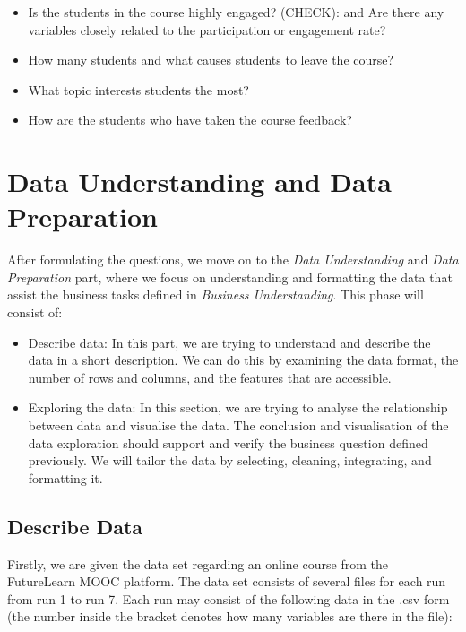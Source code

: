 \documentclass[12pt,]{article}
\providecommand{\tightlist}{%
\setlength{\itemsep}{0pt}\setlength{\parskip}{0pt}}
\begin{document}
\begin{itemize}
\tightlist
\item
  Is the students in the course highly engaged? (CHECK): and Are there
  any variables closely related to the participation or engagement rate?
\item
  How many students and what causes students to leave the course?
\item
  What topic interests students the most?
\item
  How are the students who have taken the course feedback?
\end{itemize}

\hypertarget{data-understanding-and-data-preparation}{%
\section{Data Understanding and Data
Preparation}\label{data-understanding-and-data-preparation}}

After formulating the questions, we move on to the \emph{Data
Understanding} and \emph{Data Preparation} part, where we focus on
understanding and formatting the data that assist the business tasks
defined in \emph{Business Understanding}. This phase will consist of:

\begin{itemize}
\item
  Describe data: In this part, we are trying to understand and describe
  the data in a short description. We can do this by examining the data
  format, the number of rows and columns, and the features that are
  accessible.
\item
  Exploring the data: In this section, we are trying to analyse the
  relationship between data and visualise the data. The conclusion and
  visualisation of the data exploration should support and verify the
  business question defined previously. We will tailor the data by
  selecting, cleaning, integrating, and formatting it.
\end{itemize}

\hypertarget{describe-data}{%
\subsection{Describe Data}\label{describe-data}}

Firstly, we are given the data set regarding an online course from the
FutureLearn MOOC platform. The data set consists of several files for
each run from run 1 to run 7. Each run may consist of the following data
in the .csv form (the number inside the bracket denotes how many
variables are there in the file):
\end{document}
